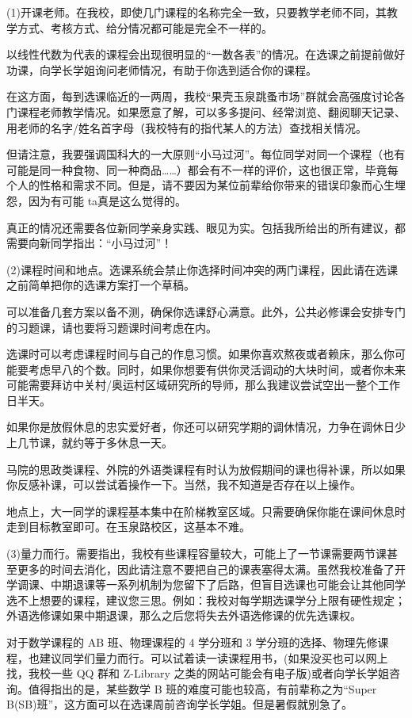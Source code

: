 (1)开课老师。在我校，即使几门课程的名称完全一致，只要教学老师不同，其教学方式、考核方式、给分情况都可能是完全不一样的。

以线性代数为代表的课程会出现很明显的“一数各表”的情况。在选课之前提前做好功课，向学长学姐询问老师情况，有助于你选到适合你的课程。

在这方面，每到选课临近的一两周，我校“果壳玉泉跳蚤市场”群就会高强度讨论各门课程老师教学情况。如果愿意了解，可以多多提问、经常浏览、翻阅聊天记录、用老师的名字/姓名首字母（我校特有的指代某人的方法）查找相关情况。

但请注意，我要强调国科大的一大原则“小马过河”。每位同学对同一个课程（也有可能是同一种食物、同一种商品……）都会有不一样的评价，这也很正常，毕竟每个人的性格和需求不同。但是，请不要因为某位前辈给你带来的错误印象而心生埋怨，因为有可能 ta真是这么觉得的。

真正的情况还需要各位新同学亲身实践、眼见为实。包括我所给出的所有建议，都需要向新同学指出：“小马过河”！

(2)课程时间和地点。选课系统会禁止你选择时间冲突的两门课程，因此请在选课之前简单把你的选课方案打一个草稿。

可以准备几套方案以备不测，确保你选课舒心满意。此外，公共必修课会安排专门的习题课，请也要将习题课时间考虑在内。

选课时可以考虑课程时间与自己的作息习惯。如果你喜欢熬夜或者赖床，那么你可能要考虑早八的个数。同时，如果你想要有供你灵活调动的大块时间，或者你未来可能需要拜访中关村/奥运村区域研究所的导师，那么我建议尝试空出一整个工作日半天。

如果你是放假休息的忠实爱好者，你还可以研究学期的调休情况，力争在调休日少上几节课，就约等于多休息一天。

马院的思政类课程、外院的外语类课程有时认为放假期间的课也得补课，所以如果你反感补课，可以尝试着操作一下。当然，我不知道是否存在以上操作。

地点上，大一同学的课程基本集中在阶梯教室区域。只需要确保你能在课间休息时走到目标教室即可。在玉泉路校区，这基本不难。

(3)量力而行。需要指出，我校有些课程容量较大，可能上了一节课需要两节课甚至更多的时间去消化，因此请注意不要把自己的课表塞得太满。虽然我校准备了开学调课、中期退课等一系列机制为您留下了后路，但盲目选课也可能会让其他同学选不上想要的课程，建议您三思。例如：我校对每学期选课学分上限有硬性规定；外语选修课如果中期退课，那么之后您将失去外语选修课的优先选课权。

对于数学课程的 AB 班、物理课程的 4 学分班和 3 学分班的选择、物理先修课程，也建议同学们量力而行。可以试着读一读课程用书，(如果没买也可以网上找，我校一些 QQ 群和 Z-Library 之类的网站可能会有电子版)或者向学长学姐咨询。值得指出的是，某些数学 B 班的难度可能也较高，有前辈称之为“Super B(SB)班”，这方面可以在选课周前咨询学长学姐。但是暑假就别急了。

